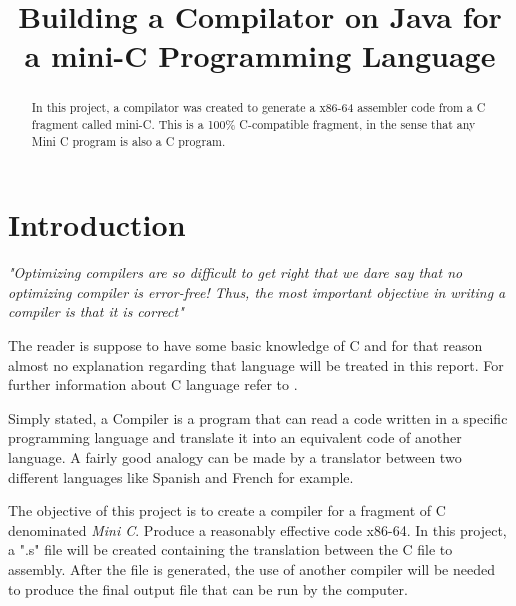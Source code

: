 \documentclass[conference]{IEEEtran}
\theoremstyle{definition}
\begin{document}
\title{Building a Compilator on Java for a mini-C Programming Language}

\author{
\and
{}
}
\maketitle

\tableofcontents
\newpage

\begin{abstract}
In this project, a compilator was created to generate a x86-64 assembler code from a C fragment called mini-C.
This is a 100\% C-compatible fragment, in the sense that any Mini C program is also a C program. 
\end{abstract}

\IEEEpeerreviewmaketitle

\section{Introduction}
\textit{"Optimizing compilers are so difficult to get right that we dare say that no optimizing compiler is error-free! Thus, the most important objective in writing a compiler is that it is correct"}\cite{DRAGON_BOOK}

The reader is suppose to have some basic knowledge of C and for that reason almost no explanation regarding that language will be treated in this report. For further information about C language refer to \cite{LANGUAGE_C}.

Simply stated, a Compiler is a program that can read a code written in a specific programming language and translate it into an equivalent code of another language. A fairly good analogy can be made by a translator between two different languages like Spanish and French for example.

The objective of this project is to create a compiler for a fragment of C denominated \textit{Mini C}. Produce a reasonably effective code x86-64. In this project, a ".s" file will be created containing the translation between the C file to assembly. After the file is generated, the use of another compiler will be needed to produce the final output file that can be run by the computer. 
\end{document}
